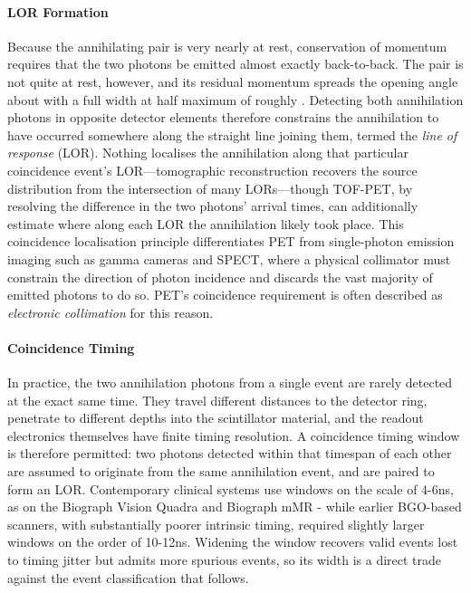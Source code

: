 \paragraph{LOR Formation}
Because the annihilating pair is very nearly at rest, conservation of momentum requires that the two photons be emitted almost exactly back-to-back.
The pair is not quite at rest, however, and its residual momentum spreads the opening angle about  with a full width at half maximum of roughly  \cite{Colombino2007}.
Detecting both annihilation photons in opposite detector elements therefore constrains the annihilation to have occurred somewhere along the straight line joining them, termed the \emph{line of response} (LOR).
Nothing localises the annihilation along that particular coincidence event's LOR---tomographic reconstruction recovers the source distribution from the intersection of many LORs---though TOF-PET, by resolving the difference in the two photons' arrival times, can additionally estimate where along each LOR the annihilation likely took place.
This coincidence localisation principle differentiates PET from single-photon emission imaging such as gamma cameras and SPECT, where a physical collimator must constrain the direction of photon incidence and discards the vast majority of emitted photons to do so.
PET's coincidence requirement is often described as \emph{electronic collimation} for this reason.

\paragraph{Coincidence Timing}
In practice, the two annihilation photons from a single event are rarely detected at the exact same time.
They travel different distances to the detector ring, penetrate to different depths into the scintillator material, and the readout electronics themselves have finite timing resolution.
A coincidence timing window is therefore permitted: two photons detected within that timespan of each other are assumed to originate from the same annihilation event, and are paired to form an LOR.
Contemporary clinical systems use windows on the scale of 4-6ns, as on the Biograph Vision Quadra \cite{Prenosil2021} and Biograph mMR \cite{Karlberg2016} - while earlier BGO-based scanners, with substantially poorer intrinsic timing, required slightly larger windows on the order of 10-12ns.
Widening the window recovers valid events lost to timing jitter but admits more spurious events, so its width is a direct trade against the event classification that follows.

